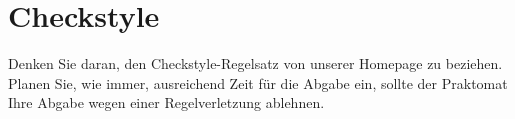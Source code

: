 \section*{Checkstyle}
Denken Sie daran, den Checkstyle-Regelsatz von unserer Homepage zu beziehen. 
Planen Sie, wie immer, ausreichend Zeit für die Abgabe ein, sollte der Praktomat Ihre Abgabe wegen einer Regelverletzung ablehnen.